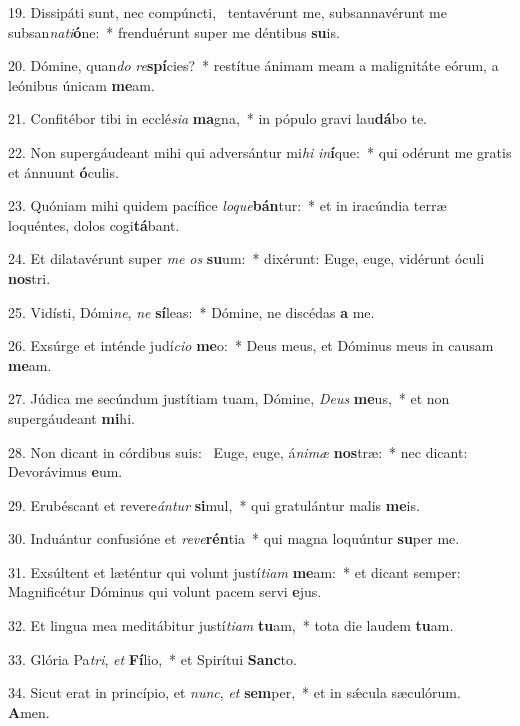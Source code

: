 19. Dissipáti sunt, nec compúncti, \dag\  tentavérunt me, subsannavérunt me subsan\textit{na}\textit{ti}\textbf{ó}ne:~*  frenduérunt super me déntibus \textbf{su}is.\

20. Dómine, quan\textit{do} \textit{re}\textbf{spí}cies?~*  restítue ánimam meam a malignitáte eórum, a leónibus únicam \textbf{me}am.\

21. Confitébor tibi in ecclé\textit{si}\textit{a} \textbf{ma}gna,~*  in pópulo gravi lau\textbf{dá}bo te.\

22. Non supergáudeant mihi qui adversántur mi\textit{hi} \textit{in}\textbf{í}que:~*  qui odérunt me gratis et ánnuunt \textbf{ó}culis.\

23. Quóniam mihi quidem pacífice \textit{lo}\textit{que}\textbf{bán}tur:~*  et in iracúndia terræ loquéntes, dolos cogi\textbf{tá}bant.\

24. Et dilatavérunt super \textit{me} \textit{os} \textbf{su}um:~*  dixérunt: Euge, euge, vidérunt óculi \textbf{nos}tri.\

25. Vidísti, Dómi\textit{ne}, \textit{ne} \textbf{sí}leas:~*  Dómine, ne discédas \textbf{a} me.\

26. Exsúrge et inténde judí\textit{ci}\textit{o} \textbf{me}o:~*  Deus meus, et Dóminus meus in causam \textbf{me}am.\

27. Júdica me secúndum justítiam tuam, Dómine, \textit{De}\textit{us} \textbf{me}us,~*  et non supergáudeant \textbf{mi}hi.\

28. Non dicant in córdibus suis: \dag\  Euge, euge, á\textit{ni}\textit{mæ} \textbf{nos}træ:~*  nec dicant: Devorávimus \textbf{e}um.\

29. Erubéscant et revere\textit{án}\textit{tur} \textbf{si}mul,~*  qui gratulántur malis \textbf{me}is.\

30. Induántur confusióne et \textit{re}\textit{ve}\textbf{rén}tia~*  qui magna loquúntur \textbf{su}per me.\

31. Exsúltent et læténtur qui volunt justí\textit{ti}\textit{am} \textbf{me}am:~*  et dicant semper: Magnificétur Dóminus qui volunt pacem servi \textbf{e}jus.\

32. Et lingua mea meditábitur justí\textit{ti}\textit{am} \textbf{tu}am,~*  tota die laudem \textbf{tu}am.\

33. Glória Pa\textit{tri}, \textit{et} \textbf{Fí}lio,~*  et Spirítui \textbf{Sanc}to.\

34. Sicut erat in princípio, et \textit{nunc}, \textit{et} \textbf{sem}per,~*  et in sǽcula sæculórum. \textbf{A}men.\

